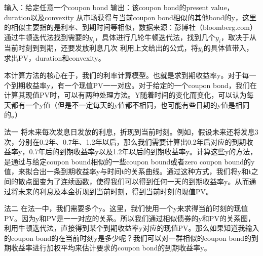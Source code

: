 输入：给定任意一个coupon bond
输出：该coupon bond的present value， duration以及convexity
	从市场获得与当前coupon bond相似的其他bond的y，这里的相似主要指的是利率、到期时间等相似，数据来源：彭博社（bloomberg.com）
	通过牛顿迭代法找到需要的$y_i$，具体进行几轮牛顿迭代法，找到几个$y_i$，取决于从当前时刻到到期，还要发放利息几次
	利用上文给出的公式，将$y_i$的具体值带入，求出PV，duration和convexity。

本计算方法的核心在于，我们的利率计算模型。也就是求到期收益率y。对于每一个到期收益率y，有一个现值PV一一对应。对于给定的一个coupon bond，我们在计算其现值PV时，可以有两种处理方法。Y随着时间的变化而变化，可以认为每天都有一个y值（但是不一定每天的y值都不相同，也可能有些日期的y值是相同的。）

法一
将未来每次发息日发放的利息，折现到当前时刻。例如，假设未来还将发息3次，分别在0.2年、0.7年、1.2年以后，那么我们需要计算出0.2年后对应的到期收益率y，0.7年后的到期收益率y以及1.2年以后的到期收益率y。计算这些y的方法，是通过与给定coupon bound相似的一些coupon bound或者zero coupon bound的y值，来拟合出一条到期收益率y与时间t的关系曲线。通过这种方式，我们将y和t之间的散点图变为了连续函数，使得我们可以得到任何一天的到期收益率y。从而通过将未来的利息及本金折现到当前时刻，得到当前时刻的现值PV。

法二
在法一中，我们需要多个y。这里，我们使用一个y来求得当前时刻的现值PV。因为y和PV是一一对应的关系。所以我们通过相似债券的y和PV的关系图，利用牛顿迭代法，直接得到某个到期收益率y对应的现值PV。那么如果知道我输入的coupon bond的在当前时刻y是多少呢？我们可以对一群相似的coupon bond的到期收益率进行加权平均来估计要求的coupon bond的到期收益率y。
